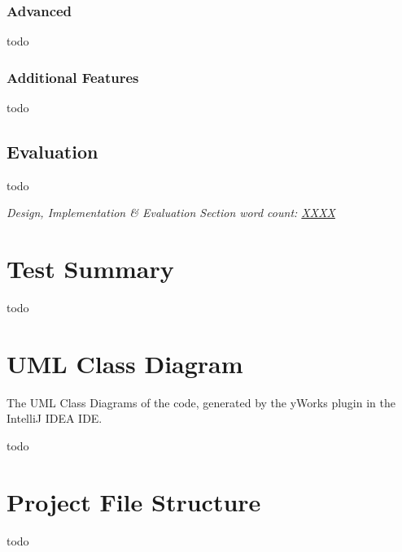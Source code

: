 \documentclass[letterpaper,12pt]{article}
\begin{document}
\subsubsection{Advanced}

todo


\subsubsection{Additional Features}

todo


\subsection{Evaluation}
\label{sec:evaluation}

todo

\textit{Design, Implementation \& Evaluation Section word count: \underline{XXXX}}

\section{Test Summary}
\label{sec:test-summary}

todo


\begin{appendices}

\clearpage




\clearpage
\section{UML Class Diagram}
\label{sec:appendix-uml-class-diagram}

The UML Class Diagrams of the code, generated by the yWorks \cite{yworks} plugin in the IntelliJ IDEA IDE.

todo


\clearpage
\section{Project File Structure}
\label{sec:appendix-project-file-structure}

todo


\end{appendices}
\end{document}
